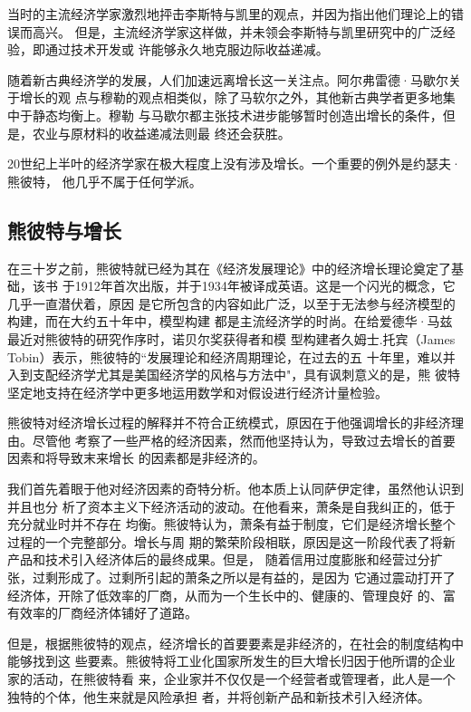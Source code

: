 当时的主流经济学家激烈地抨击李斯特与凯里的观点，并因为指出他们理论上的错误而高兴。
但是，主流经济学家这样做，并未领会李斯特与凯里研究中的广泛经验，即通过技术开发或
许能够永久地克服边际收益递减。

随着新古典经济学的发展，人们加速远离增长这一关注点。阿尔弗雷德·马歇尔关于增长的观
点与穆勒的观点相类似，除了马软尔之外，其他新古典学者更多地集中于静态均衡上。穆勒
与马歇尔都主张技术进步能够暂时创造出增长的条件，但是，农业与原材料的收益递减法则最
终还会获胜。

20世纪上半叶的经济学家在极大程度上没有涉及增长。一个重要的例外是约瑟夫·熊彼特，
他几乎不属于任何学派。

\subsection{熊彼特与增长}

在三十岁之前，熊彼特就已经为其在《经济发展理论》中的经济增长理论奠定了基础，该书
于1912年首次出版，并于1934年被译成英语。这是一个闪光的概念，它几乎一直潜伏着，原因
是它所包含的内容如此广泛，以至于无法参与经济模型的构建，而在大约五十年中，模型构建
都是主流经济学的时尚。在给爱德华·马兹最近对熊彼特的研究作序时，诺贝尔奖获得者和模
型构建者久姆士.托宾（James Tobin）表示，熊彼特的“发展理论和经济周期理论，在过去的五
十年里，难以并入到支配经济学尤其是美国经济学的风格与方法中"，具有讽刺意义的是，熊
彼特坚定地支持在经济学中更多地运用数学和对假设进行经济计量检验。

熊彼特对经济增长过程的解释并不符合正统模式，原因在于他强调增长的非经济理由。尽管他
考察了一些严格的经济因素，然而他坚持认为，导致过去增长的首要因素和将导致末来增长
的因素都是非经济的。

我们首先着眼于他对经济因素的奇特分析。他本质上认同萨伊定律，虽然他认识到并且也分
析了资本主义下经济活动的波动。在他看来，萧条是自我纠正的，低于充分就业时并不存在
均衡。熊彼特认为，萧条有益于制度，它们是经济增长整个过程的一个完整部分。增长与周
期的繁荣阶段相联，原因是这一阶段代表了将新产品和技术引入经济体后的最终成果。但是，
随着信用过度膨胀和经营过分扩张，过剩形成了。过剩所引起的萧条之所以是有益的，是因为
它通过震动打开了经济体，开除了低效率的厂商，从而为一个生长中的、健康的、管理良好
的、富有效率的厂商经济体铺好了道路。

但是，根据熊彼特的观点，经济增长的首要要素是非经济的，在社会的制度结构中能够找到这
些要素。熊彼特将工业化国家所发生的巨大增长归因于他所谓的企业家的活动，在熊彼特看
来，企业家并不仅仅是一个经营者或管理者，此人是一个独特的个体，他生来就是风险承担
者，并将创新产品和新技术引入经济体。


